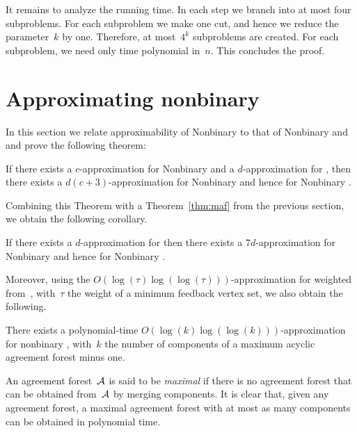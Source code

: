 It remains to analyze the running time. In each step we branch into at most four subproblems. For each subproblem we make one cut, and hence we reduce the parameter~$k$ by one. Therefore, at most~$4^k$ subproblems are created. For each subproblem, we need only time polynomial in~$n$. This concludes the proof.





\section{Approximating nonbinary \maaf}
\label{sec:nbmaaf}


In this section we relate approximability of Nonbinary \maaf to that of Nonbinary \maf and \dfvs and prove the following theorem:

\begin{theorem}
\label{thm:maafapprox}
If there exists a $c$-approximation for Nonbinary \maf and a $d$-approximation for \dfvs, then there exists a $d(c+3)$-approximation for Nonbinary \maaf and hence for Nonbinary \mh.
\end{theorem}


Combining this Theorem with a Theorem~\ref{thm:maf} from the previous section, we obtain the following corollary.

\begin{corollary}
If there exists a $d$-approximation for \dfvs then there exists a $7d$-approximation for Nonbinary \maaf and hence for Nonbinary \mh.
\end{corollary}

Moreover, using the $O(\log(\tau)\log(\log(\tau)))$-approximation for weighted \dfvs from~\cite{dfvsApprox}, with~$\tau$ the weight of a minimum feedback vertex set, we also obtain the following.

\begin{corollary}
There exists a polynomial-time $O(\log(k)\log(\log(k)))$-approximation for nonbinary \maaf, with~$k$ the number of components of a maximum acyclic agreement forest minus one.
\end{corollary}



An agreement forest~${\mathcal A}$ is said to be \emph{maximal} if there is no agreement forest that can be obtained from~${\mathcal A}$ by merging components. It is clear that, given any agreement forest, a maximal agreement forest with at most as many components can be obtained in polynomial time.

